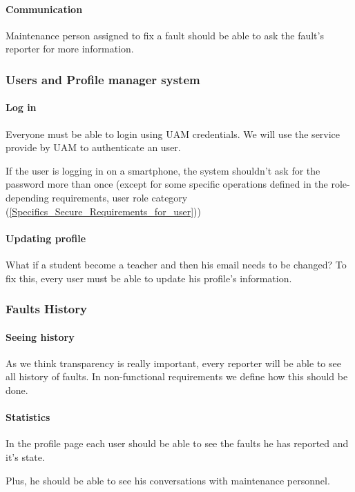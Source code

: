 \paragraph{Communication} Maintenance person assigned to fix a fault should be able to ask the fault's reporter for more information.


\subsubsection{Users and Profile manager system}

\paragraph{Log in} Everyone must be able to login using UAM credentials. We will use the service provide by UAM to authenticate an user.

If the user is logging in on a smartphone, the system shouldn't ask for the password more than once (except for some specific operations defined in the role-depending requirements, user role category (\ref{Specifics_Secure_Requirements_for_user}))

\paragraph{Updating profile} What if a student become a teacher and then his email needs to be changed? To fix this, every user must be able to update his profile's information.


\subsubsection{Faults History}

\paragraph{Seeing history} As we think transparency is really important, every reporter will be able to see all history of faults. In non-functional requirements we define how this should be done.

\paragraph{Statistics} In the profile page each user should be able to see the faults he has reported and it's state.

Plus, he should be able to see his conversations with maintenance personnel.


